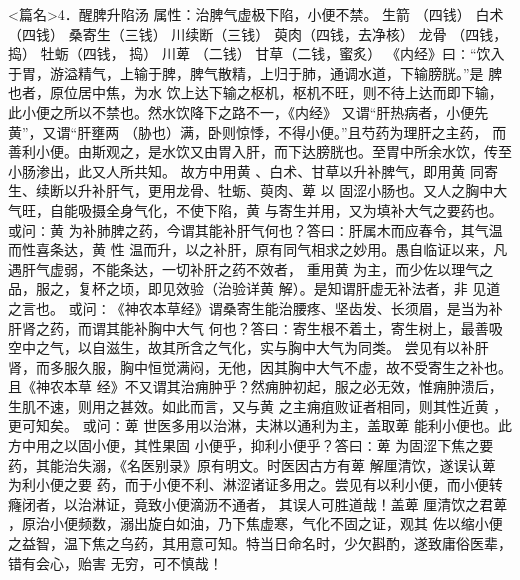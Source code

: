 \documentclass[a4paper,12pt,UTF8,twoside]{ctexbook}
\begin{document}
<篇名>4．醒脾升陷汤
属性：治脾气虚极下陷，小便不禁。 
生箭 （四钱） 白术（四钱） 桑寄生（三钱） 川续断（三钱） 萸肉（四钱，去净核） 龙骨 
（四钱， 捣） 牡蛎（四钱， 捣） 川萆 （二钱） 甘草（二钱，蜜炙） 
《内经》曰∶“饮入于胃，游溢精气，上输于脾，脾气散精，上归于肺，通调水道，下输膀胱。”是 
脾也者，原位居中焦，为水 
饮上达下输之枢机，枢机不旺，则不待上达而即下输，此小便之所以不禁也。然水饮降下之路不一，《内经》 
又谓“肝热病者，小便先黄”，又谓“肝壅两 （胁也）满，卧则惊悸，不得小便。”且芍药为理肝之主药， 
而善利小便。由斯观之，是水饮又由胃入肝，而下达膀胱也。至胃中所余水饮，传至小肠渗出，此又人所共知。 
故方中用黄 、白术、甘草以升补脾气，即用黄 同寄生、续断以升补肝气，更用龙骨、牡蛎、萸肉、萆 以 
固涩小肠也。又人之胸中大气旺，自能吸摄全身气化，不使下陷，黄 与寄生并用，又为填补大气之要药也。 
或问∶黄 为补肺脾之药，今谓其能补肝气何也？答曰∶肝属木而应春令，其气温而性喜条达，黄 性 
温而升，以之补肝，原有同气相求之妙用。愚自临证以来，凡遇肝气虚弱，不能条达，一切补肝之药不效者， 
重用黄 为主，而少佐以理气之品，服之，复杯之顷，即见效验（治验详黄 解）。是知谓肝虚无补法者，非 
见道之言也。 
或问∶《神农本草经》谓桑寄生能治腰疼、坚齿发、长须眉，是当为补肝肾之药，而谓其能补胸中大气 
何也？答曰∶寄生根不着土，寄生树上，最善吸空中之气，以自滋生，故其所含之气化，实与胸中大气为同类。 
尝见有以补肝肾，而多服久服，胸中恒觉满闷，无他，因其胸中大气不虚，故不受寄生之补也。且《神农本草 
经》不又谓其治痈肿乎？然痈肿初起，服之必无效，惟痈肿溃后，生肌不速，则用之甚效。如此而言，又与黄 
之主痈疽败证者相同，则其性近黄 ，更可知矣。 
或问∶萆 世医多用以治淋，夫淋以通利为主，盖取萆 能利小便也。此方中用之以固小便，其性果固 
小便乎，抑利小便乎？答曰∶萆 为固涩下焦之要药，其能治失溺，《名医别录》原有明文。时医因古方有萆 
解厘清饮，遂误认萆 为利小便之要 
药，而于小便不利、淋涩诸证多用之。尝见有以利小便，而小便转癃闭者，以治淋证，竟致小便滴沥不通者， 
其误人可胜道哉！盖萆 厘清饮之君萆 ，原治小便频数，溺出旋白如油，乃下焦虚寒，气化不固之证，观其 
佐以缩小便之益智，温下焦之乌药，其用意可知。特当日命名时，少欠斟酌，遂致庸俗医辈，错有会心，贻害 
无穷，可不慎哉！ 
\end{document}
